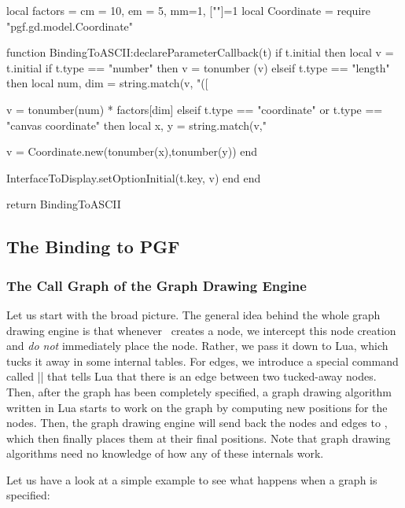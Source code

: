 \begin{codeexample}
local factors = { cm = 10, em = 5, mm=1, [""]=1 }
local Coordinate = require "pgf.gd.model.Coordinate"

function BindingToASCII:declareParameterCallback(t)
  if t.initial then
    local v = t.initial
    if t.type == "number" then
      v = tonumber (v)
    elseif t.type == "length" then
      local num, dim = string.match(v, "([%

      v = tonumber(num) * factors[dim]
    elseif t.type == "coordinate" or t.type == "canvas coordinate" then
      local x, y = string.match(v,"%

      v = Coordinate.new(tonumber(x),tonumber(y))
    end

    InterfaceToDisplay.setOptionInitial(t.key, v)
  end
end

return BindingToASCII
\end{codeexample}


\subsection{The Binding to PGF}


\subsubsection{The Call Graph of the Graph Drawing Engine}

Let us start with the broad picture. The general idea behind the whole
graph drawing engine is that whenever \pgfname\ creates a node, we
intercept this node creation and \emph{do not} immediately place the
node. Rather, we pass it down to Lua, which tucks it away in
some internal tables. For edges, we introduce a special command called
|\pgfgdedge| that tells Lua that there is an edge between two
tucked-away nodes. Then, after the graph has been completely
specified, a graph drawing algorithm written in Lua starts to work on
the graph by computing new positions for the nodes. Then, the graph
drawing engine will send back the nodes and edges to \pgfname, which
then finally places them at their final positions.
Note that graph drawing algorithms need no knowledge of how any of
these internals work.

Let us have a look at a simple example to see what happens when a
graph is specified:


